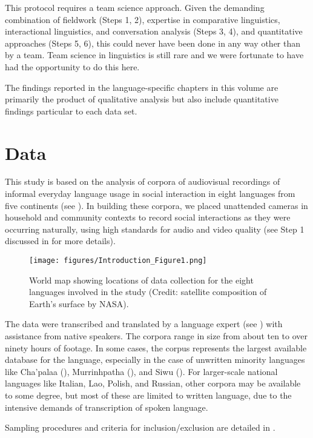 \documentclass[output=paper,modfonts,nonflat]{langsci/langscibook}
\begin{document}
This protocol requires a team science approach. Given the demanding combination of fieldwork (Steps 1, 2), expertise in comparative linguistics, interactional linguistics, and conversation analysis (Steps 3, 4), and quantitative approaches (Steps 5, 6), this could never have been done in any way other than by a team. Team science in linguistics is still rare and we were fortunate to have had the opportunity to do this here.

The findings reported in the language-specific chapters in this volume are primarily the product of qualitative analysis but also include quantitative findings particular to each data set.

\section{Data}\label{sec:intro:7}

This study is based on the analysis of corpora of audiovisual recordings of informal everyday language usage in social interaction in eight languages from five continents (see ). In building these corpora, we placed unattended cameras in household and community contexts to record social interactions as they were occurring naturally, using high standards for audio and video quality (see Step 1 discussed in  for more details).

\begin{figure}
\caption{World map showing locations of data collection for the eight languages involved in the study (Credit: satellite composition of Earth's surface by NASA).\label{fig:intro:1}}
\texttt{[image: figures/Introduction\_Figure1.png]}
\end{figure}

The data were transcribed and translated by a language expert (see ) with assistance from native speakers. The corpora range in size from about ten to over ninety hours of footage. In some cases, the corpus represents the largest available database for the language, especially in the case of unwritten minority languages like Cha’palaa (), Murrinhpatha (), and Siwu (). For larger-scale national languages like Italian, Lao, Polish, and Russian, other corpora may be available to some degree, but most of these are limited to written language, due to the intensive demands of transcription of spoken language.

Sampling procedures and criteria for inclusion/exclusion are detailed in .
\end{document}
